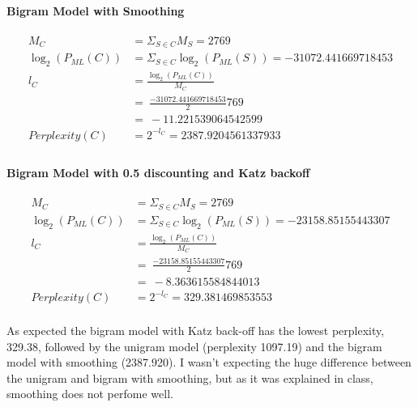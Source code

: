 \documentclass{article}
\begin{document}
\paragraph{Bigram Model with Smoothing}
\begin{equation}
\begin{split}
M_{C} &= \Sigma_{S \in C} M_{S} = 2769 \\
\log_{2} (P_{ML}(C)) &= \Sigma_{S \in C} \log_{2} (P_{ML}(S)) = -31072.441669718453 \\
l_{C} &= \frac{\log_{2}(P_{ML}(C))}{M_{C}} \\ &=\  \frac{-31072.441669718453}2769 \\ &=\   -11.221539064542599 \\
Perplexity(C) &= 2^{-l_{C}} = 2387.9204561337933\\
\end{split}
\end{equation}
\paragraph{Bigram Model with 0.5 discounting and Katz backoff}
\begin{equation}
\begin{split}
M_{C} &= \Sigma_{S \in C} M_{S} = 2769 \\
\log_{2} (P_{ML}(C)) &= \Sigma_{S \in C} \log_{2} (P_{ML}(S)) = -23158.85155443307 \\
l_{C} &= \frac{\log_{2}(P_{ML}(C))}{M_{C}} \\ &=\  \frac{-23158.85155443307}2769 \\ &=\   -8.363615584844013 \\
Perplexity(C) &= 2^{-l_{C}} = 329.381469853553\\
\end{split}
\end{equation}

As expected the bigram model with Katz back-off has the lowest perplexity, 329.38, followed by the unigram model (perplexity 1097.19) and the bigram model with smoothing (2387.920). I wasn't expecting the huge difference between the unigram and bigram with smoothing, but as it was explained in class, smoothing does not perfome well.
\end{document}
